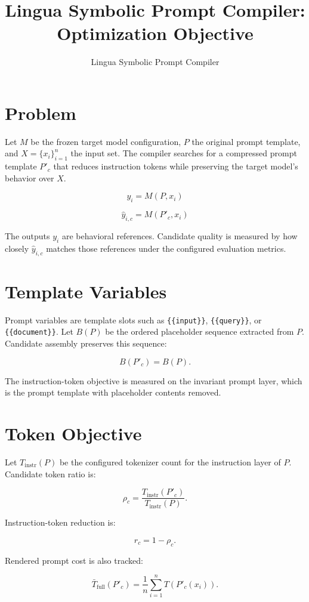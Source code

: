 \documentclass[11pt]{article}
\title{Lingua Symbolic Prompt Compiler: Optimization Objective}
\author{Lingua Symbolic Prompt Compiler}
\date{}
\begin{document}
\maketitle

\section{Problem}

Let \(M\) be the frozen target model configuration, \(P\) the original prompt
template, and \(X = \{x_i\}_{i=1}^{n}\) the input set. The compiler searches for
a compressed prompt template \(P'_c\) that reduces instruction tokens while
preserving the target model's behavior over \(X\).

\[
y_i = M(P, x_i)
\]

\[
\hat{y}_{i,c} = M(P'_c, x_i)
\]

The outputs \(y_i\) are behavioral references. Candidate quality is measured by
how closely \(\hat{y}_{i,c}\) matches those references under the configured
evaluation metrics.

\section{Template Variables}

Prompt variables are template slots such as \texttt{\{\{input\}\}},
\texttt{\{\{query\}\}}, or \texttt{\{\{document\}\}}. Let \(B(P)\) be the
ordered placeholder sequence extracted from \(P\). Candidate assembly preserves
this sequence:

\[
B(P'_c) = B(P).
\]

The instruction-token objective is measured on the invariant prompt layer,
which is the prompt template with placeholder contents removed.

\section{Token Objective}

Let \(T_{\mathrm{instr}}(P)\) be the configured tokenizer count for the
instruction layer of \(P\). Candidate token ratio is:

\[
\rho_c =
\frac{T_{\mathrm{instr}}(P'_c)}
     {T_{\mathrm{instr}}(P)}.
\]

Instruction-token reduction is:

\[
r_c = 1 - \rho_c.
\]

Rendered prompt cost is also tracked:

\[
\bar{T}_{\mathrm{full}}(P'_c) =
\frac{1}{n}\sum_{i=1}^{n} T(P'_c(x_i)).
\]
\end{document}
